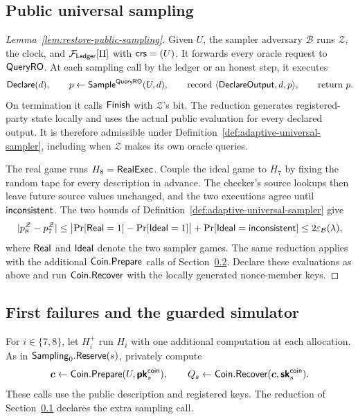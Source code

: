 \subsection{Public universal sampling}
\label{sec:sampler-hybrid-proof}
\begin{proof}[Lemma~\ref{lem:restore-public-sampling}]
Given $U$, the sampler adversary $\mathcal B$ runs $\mathcal Z$, the clock, and
$\mathcal F_{\mathsf{Ledger}}[\Pi]$ with $\mathsf{crs}=(U)$.  It forwards every oracle request to
$\mathsf{QueryRO}$.  At each sampling call by the ledger or an honest step,
it executes
\[
 \mathsf{Declare}(d),\qquad p\gets\mathsf{Sample}^{\mathsf{QueryRO}}(U,d),\qquad
 \text{record }\langle\mathsf{DeclareOutput},d,p\rangle,\qquad \text{return }p.
\]
On termination it calls $\mathsf{Finish}$ with $\mathcal Z$'s bit.  The reduction
generates registered-party state locally and uses the actual public
evaluation for every declared output.  It is therefore admissible under
Definition~\ref{def:adaptive-universal-sampler}, including when
$\mathcal Z$ makes its own oracle queries.

The real game runs $H_8=\mathsf{RealExec}$.  Couple the ideal game to $H_7$ by
fixing the random tape for every description in advance.  The checker's
source lookups then leave future source values unchanged, and the two
executions agree until $\mathsf{inconsistent}$.  The two bounds of
Definition~\ref{def:adaptive-universal-sampler} give
\[
 |p_8^{\mathcal Z}-p_7^{\mathcal Z}|
 \leq \bigl|\Pr[\mathsf{Real}=1]-\Pr[\mathsf{Ideal}=1]\bigr|
      +\Pr[\mathsf{Ideal}=\mathsf{inconsistent}]\leq 2\varepsilon_{\mathcal B}(\lambda),
\]
where $\mathsf{Real}$ and $\mathsf{Ideal}$ denote the two sampler games.
The same reduction applies with the additional $\mathsf{Coin}.\mathsf{Prepare}$ calls of
Section~\ref{sec:guard-hybrid-proof}.  Declare these evaluations as above
and run $\mathsf{Coin}.\mathsf{Recover}$ with the locally generated nonce-member keys.
\end{proof}

\subsection{First failures and the guarded simulator}
\label{sec:guard-hybrid-proof}

For $i\in\{7,8\}$, let $H_i^+$ run $H_i$ with one additional computation
at each allocation.  As in $\mathsf{Sampling}_0.\mathsf{Reserve}(s)$, privately compute
\[
 \boldsymbol c\gets\mathsf{Coin}.\mathsf{Prepare}(U,\boldsymbol{\mathsf{pk}}^{\mathsf{coin}}_s),
 \qquad
 Q_s\gets\mathsf{Coin}.\mathsf{Recover}(\boldsymbol c,\boldsymbol{\mathsf{sk}}^{\mathsf{coin}}_s).
\]
These calls use the public description and registered keys.  The reduction
of Section~\ref{sec:sampler-hybrid-proof} declares the extra sampling call.

